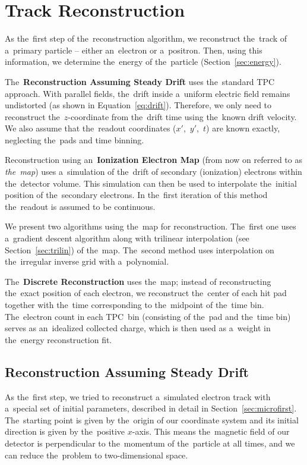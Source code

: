 \chapter{Track Reconstruction}
\label{sec:track}
	As the~first step of the~reconstruction algorithm, we reconstruct the~track of a~primary particle -- either an~electron or a~positron. Then, using this information, we determine the~energy of the~particle (Section~\ref{sec:energy}).
	
	The~\textbf{Reconstruction Assuming Steady Drift} uses the~standard \ac{TPC} approach. With parallel fields, the~drift inside a~uniform electric field remains undistorted (as shown in Equation~\ref{eq:drift}). Therefore, we only need to reconstruct the~$z$\nobreakdash-coordinate from the~drift time using the~known drift velocity. We also assume that the~readout coordinates ($x'$,~$y'$,~$t$) are known exactly, neglecting the~pads and time binning.
	
	Reconstruction using an~\textbf{Ionization Electron Map} (from now on referred to as \emph{the~map}) uses a~simulation of the~drift of secondary (ionization) electrons within the~detector volume. This simulation can then be used to interpolate the~initial position of the~secondary electrons. In the~first iteration of this method the~readout is assumed to be continuous.
	
	We present two algorithms using the~map for reconstruction. The~first one uses a~gradient descent algorithm along with trilinear interpolation (see Section~\ref{sec:trilin}) of the~map. The~second method uses interpolation on the~irregular inverse grid with a~polynomial.
	
	The~\textbf{Discrete Reconstruction} uses the~map; instead of reconstructing the~exact position of each electron, we reconstruct the~center of each hit pad together with the~time corresponding to the~midpoint of the~time bin. The~electron count in each \ac{TPC}~bin (consisting of the~pad and the~time bin) serves as an~idealized collected charge, which is then used as a~weight in the~energy reconstruction fit.
	
	\section{Reconstruction Assuming Steady Drift}
	\label{sec:trackfirst}
		As the~first step, we tried to reconstruct a~simulated electron track with a~special set of initial parameters, described in detail in Section~\ref{sec:microfirst}. The~starting point is given by the~origin of our coordinate system and its initial direction is given by the~positive $x$\nobreakdash-axis. This means the~magnetic field of our detector is perpendicular to the~momentum of the~particle at all times, and we can reduce the~problem to two-dimensional space.
		

